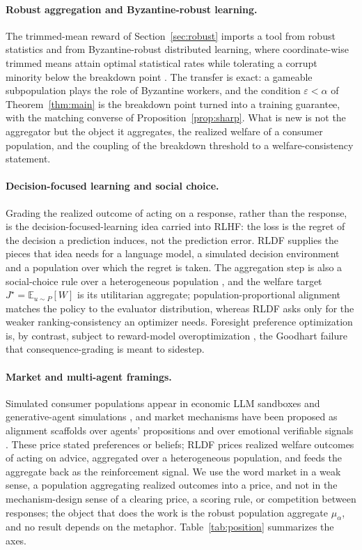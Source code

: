 \documentclass[11pt]{article}
\theoremstyle{plain}
\theoremstyle{definition}
\theoremstyle{remark}
\newcommand{\E}{\mathbb{E}}
\newcommand{\eps}{\varepsilon}
\begin{document}
\paragraph{Robust aggregation and Byzantine-robust learning.}
The trimmed-mean reward of Section~\ref{sec:robust} imports a tool from robust statistics
\cite{lugosimendelson} and from Byzantine-robust distributed learning, where coordinate-wise
trimmed means attain optimal statistical rates while tolerating a corrupt minority below the
breakdown point \cite{yin}. The transfer is exact: a gameable subpopulation plays the role of
Byzantine workers, and the condition $\eps<\alpha$ of Theorem~\ref{thm:main} is the breakdown point
turned into a training guarantee, with the matching converse of Proposition~\ref{prop:sharp}. What
is new is not the aggregator but the object it aggregates, the realized welfare of a consumer
population, and the coupling of the breakdown threshold to a welfare-consistency statement.

\paragraph{Decision-focused learning and social choice.}
Grading the realized outcome of acting on a response, rather than the response, is the
decision-focused-learning idea \cite{spo} carried into RLHF: the loss is the regret of the
decision a prediction induces, not the prediction error. RLDF supplies the pieces that idea needs
for a language model, a simulated decision environment and a population over which the regret is
taken. The aggregation step is also a social-choice rule over a heterogeneous population
\cite{conitzer}, and the welfare target $J^\star=\E_{u\sim P}[W]$ is its utilitarian aggregate;
population-proportional alignment \cite{popalign} matches the policy to the evaluator distribution,
whereas RLDF asks only for the weaker ranking-consistency an optimizer needs. Foresight preference
optimization is, by contrast, subject to reward-model overoptimization \cite{overopt}, the Goodhart
failure that consequence-grading is meant to sidestep.

\paragraph{Market and multi-agent framings.}
Simulated consumer populations appear in economic LLM sandboxes \cite{malles} and
generative-agent simulations \cite{genagents}, and market mechanisms have been proposed as
alignment scaffolds over agents' propositions \cite{marketmaking} and over emotional verifiable
signals \cite{rlver}. These price stated preferences or beliefs; RLDF prices realized welfare
outcomes of acting on advice, aggregated over a heterogeneous population, and feeds the aggregate
back as the reinforcement signal. We use the word market in a weak sense, a population
aggregating realized outcomes into a price, and not in the mechanism-design sense of a clearing
price, a scoring rule, or competition between responses; the object that does the work is the
robust population aggregate $\mu_\alpha$, and no result depends on the metaphor.
Table~\ref{tab:position} summarizes the axes.
\end{document}
